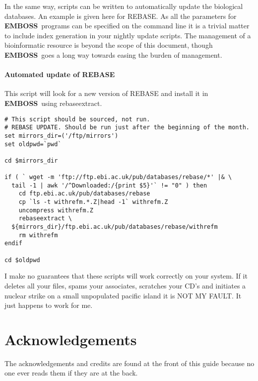 \documentclass{report}
\newcommand{\progname}[1]{{\sc #1}}
\newcommand{\EMBOSS}{{\sf\bfseries EMBOSS}}
\begin{document}
In the same way, scripts can be written to automatically update the biological databases. An example is given here for REBASE. As all the parameters for \EMBOSS\ programs can be specified on the command line it is a trivial matter to include index generation in your nightly update scripts. The management of a bioinformatic resource is beyond the scope of this document, though \EMBOSS\ goes a long way towards easing the burden of management.

\subsubsection{Automated update of REBASE}

This script will look for a new version of REBASE and install it in \EMBOSS\ using \progname{rebaseextract}. 

\begin{verbatim}
# This script should be sourced, not run.
# REBASE UPDATE. Should be run just after the beginning of the month.
set mirrors_dir=('/ftp/mirrors')
set oldpwd=`pwd`

cd $mirrors_dir

if ( ` wget -m 'ftp://ftp.ebi.ac.uk/pub/databases/rebase/*' |& \
  tail -1 | awk '/^Downloaded:/{print $5}'` != "0" ) then 
	cd ftp.ebi.ac.uk/pub/databases/rebase
	cp `ls -t withrefm.*.Z|head -1` withrefm.Z
	uncompress withrefm.Z
	rebaseextract \
  ${mirrors_dir}/ftp.ebi.ac.uk/pub/databases/rebase/withrefm 
	rm withrefm
endif 

cd $oldpwd
\end{verbatim}

I make no guarantees that these scripts will work correctly on your system. If it deletes all your files, spams your associates, scratches your CD's and initiates a nuclear strike on a small unpopulated pacific island it is NOT MY FAULT.
It just happens to work for me.

\chapter{Acknowledgements}

The acknowledgements and credits are found at the front of this guide because no one ever reads them if they are at the back. 
\end{document}
